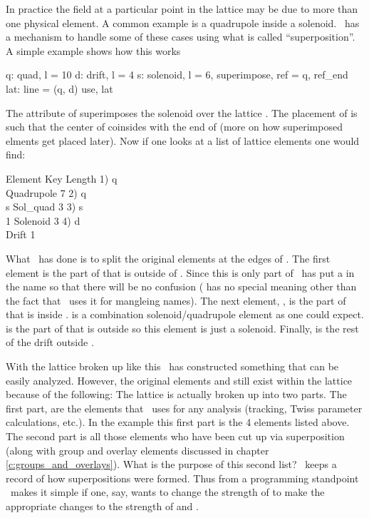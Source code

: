In practice the field at a particular point in the lattice may be due to more than one physical
element. A common example is a quadrupole inside a solenoid. \bmad\ has a mechanism to handle some
of these cases using what is called ``superposition''. A simple example shows how this works
\begin{example}
  q: quad, l = 10
  d: drift, l = 4
  s: solenoid, l = 6, superimpose, ref = q, ref_end
  lat: line = (q, d)
  use, lat
\end{example}
The  attribute of  superimposes the  solenoid over the 
lattice . The placement of  is such that the center of  coinsides
with the end of  (more on how superimposed elments get placed later). Now if one looks
at a list of lattice elements one would find:
\begin{example}
        Element   Key         Length
  1)    q\\        Quadrupole  7
  2)    q\\s       Sol_quad    3
  3)    s\\1       Solenoid    3
  4)    d\\        Drift       1
\end{example}
What \bmad\ has done is to split the original elements  at the edges of .
The first element  is the part of  that is outside of . Since this is only
part of  \bmad\ has put a \vn{\\} in the name so that there will be no confusion (\vn{\\}
has no special meaning other than the fact that \bmad\ uses it for mangleing names). The next
element, , is the part of  that is inside .  is a combination
solenoid/quadrupole element as one could expect.  is the part of 
that is outside  so this element is just a solenoid. Finally,  is the rest of the 
drift outside . 

With the lattice broken up like this \bmad\ has constructed something that can be
easily analyzed. However, the original elements  and  still exist within the lattice
because of the following: The lattice is actually broken up into two parts. The first part, 
are the elements that \bmad\ uses for any analysis (tracking, Twiss parameter calculations, etc.).
In the example this first part is the 4 elements listed above. The second part is all those elements
who have been cut up via superposition (along with group and overlay elements 
discussed in chapter \ref{c:groups_and_overlays}). What is the purpose of this second list? \bmad\
keeps a record of how superpositions were formed. Thus from a programming standpoint \bmad\ makes
it simple if one, say, wants to change the  strength of \vn{q} to make the appropriate changes
to the \vn{k1} strength of \vn{q\\} and \vn{q\\s}.

